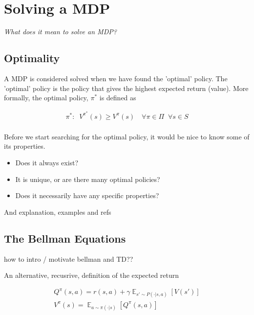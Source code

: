 \section{Solving a MDP}

\begin{displayquote}
  \textit{What does it mean to solve an MDP?}
\end{displayquote}

\subsection{Optimality}

A MDP is considered solved when we have found the 'optimal' policy. The 'optimal'
policy is the policy that gives the highest
expected return (value). More formally, the optimal policy, $\pi^{* }$ is defined as

\begin{align*}
\pi^{*} : \;\; V^{\pi^* }(s) \ge V^{\pi}(s) \quad \forall \pi\in \Pi \;\;\forall s\in S\\
\end{align*}

Before we start searching for the optimal policy, it would be nice to know some of its properties.

\begin{itemize}
\tightlist
  \item Does it always exist?
  \item It is unique, or are there many optimal policies?
  \item Does it necessarily have any specific properties?
\end{itemize}

{\color{red} And explanation, examples and refs}

\subsection{The Bellman Equations}

{\color{red}how to intro / motivate bellman and TD??}

An alternative, recusrive, definition of the expected return


\begin{align*}
Q^{\pi}(s, a) = r(s, a) + \gamma \mathop{\mathbb E}_{s' \sim P(\cdot|s, a)} [V(s')] \label{eq:bellman-eqn}\tag{Bellman equation}\\
V^{\pi}(s) = \mathop{\mathbb E}_{a \sim \pi(\cdot|s)} [Q^{\pi}(s, a)]
\end{align*}



